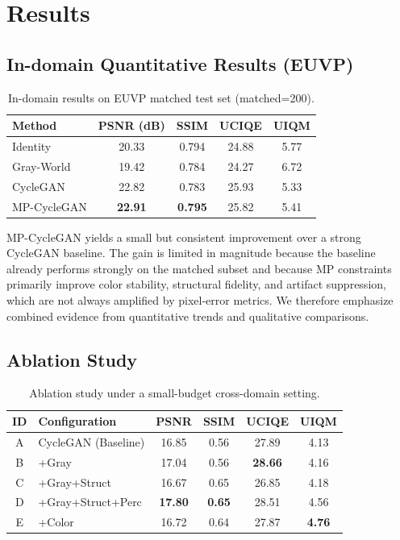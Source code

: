 \documentclass[11pt,a4paper]{article}
\begin{document}
\section{Results}
\subsection{In-domain Quantitative Results (EUVP)}
\begin{table}[h]
\centering
\caption{In-domain results on EUVP matched test set (matched=200).}
\begin{tabular}{lcccc}
\toprule
Method & PSNR (dB) & SSIM & UCIQE & UIQM \\
\midrule
Identity & 20.33 & 0.794 & 24.88 & 5.77 \\
Gray-World & 19.42 & 0.784 & 24.27 & 6.72 \\
CycleGAN & 22.82 & 0.783 & 25.93 & 5.33 \\
MP-CycleGAN & \textbf{22.91} & \textbf{0.795} & 25.82 & 5.41 \\
\bottomrule
\end{tabular}
\end{table}
MP-CycleGAN yields a small but consistent improvement over a strong CycleGAN baseline. The gain is limited in magnitude because the baseline already performs strongly on the matched subset and because MP constraints primarily improve color stability, structural fidelity, and artifact suppression, which are not always amplified by pixel-error metrics. We therefore emphasize combined evidence from quantitative trends and qualitative comparisons.
\subsection{Ablation Study}
\begin{table}[h]
\centering
\caption{Ablation study under a small-budget cross-domain setting.}
\begin{tabular}{clcccc}
\toprule
ID & Configuration & PSNR & SSIM & UCIQE & UIQM \\
\midrule
A & CycleGAN (Baseline) & 16.85 & 0.56 & 27.89 & 4.13 \\
B & +Gray & 17.04 & 0.56 & \textbf{28.66} & 4.16 \\
C & +Gray+Struct & 16.67 & 0.65 & 26.85 & 4.18 \\
D & +Gray+Struct+Perc & \textbf{17.80} & \textbf{0.65} & 28.51 & 4.56 \\
E & +Color & 16.72 & 0.64 & 27.87 & \textbf{4.76} \\
\bottomrule
\end{tabular}
\end{table}
\end{document}
